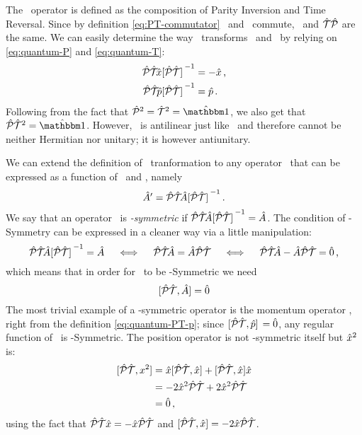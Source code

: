         The \hPT\ operator is defined as the composition of Parity Inversion and Time Reversal. Since by definition \eqref{eq:PT-commutator} \hP\ and \hT\ commute, \hPT\ and $\mathcal{\hat{T}}\mathcal{\hat{P}}$ are the same. We can easily determine the way \hPT\ transforms \hx\ and \hp\ by relying on \eqref{eq:quantum-P} and \eqref{eq:quantum-T}:
        \begin{align}
            \label{eq:quantum-PT-x}
            \PTtransform{\hx}
            &= -\hx
            \mycomma
            \\
            \label{eq:quantum-PT-p}
            \PTtransform{\hp}
            &= \hp
            \myperiod
        \end{align}
        Following from the fact that $\hP^2 = \hT^2 = \togglehat{\idM}$, we also get that $\hPT^2 = \togglehat{\idM}$. However, \hPT\ is antilinear just like \hT\ and therefore cannot be neither Hermitian nor unitary; it is however antiunitary.

        We can extend the definition of \PT\ tranformation to any operator \hA\ that can be expressed as a function of \hx\ and \hp, namely
        \begin{equation}
            \label{eq:pt-transform}
            \hA' = \PTtransform{\hA}
            \myperiod
        \end{equation}
        We say that an operator \hA\ is \emph{\PT-symmetric} if $\PTtransform{\hA} = \hA$. The condition of \PT-Symmetry can be expressed in a cleaner way via a little manipulation:
        \begin{equation*}
            \PTtransform{\hA} = \hA
            \quad\iff\quad
            \hPT\!\hA = \hA\hPT
            \quad\iff\quad
            \hPT\!\hA - \hA\hPT = \hzero
            \mycomma
        \end{equation*}
        which means that in order for \hA\ to be \PT-Symmetric we need
        \begin{equation}
            \label{eq:pt-symmetric-operator}
            \comm*{\hPT}{\hA}\! = \hzero
        \end{equation}
        The most trivial example of a \PT-symmetric operator is the momentum operator \hp, right from the definition \eqref{eq:quantum-PT-p}; since $\comm*{\hPT}{\hp} = \hzero$, any regular function of \hp\ is \PT-Symmetric. The position operator is not \PT-symmetric itself but $\hat{x}^2$ is:
        \begin{align*}
            \comm*{\hPT}{x^2}\!
            &= \hx \comm*{\hPT}{\hx}\! + \comm*{\hPT}{\hx}\! \hx \\
            &= -2\hx^2\hPT + 2\hx^2\hPT \\
            &= \hzero 
            \mycomma
        \end{align*}
        using the fact that $\mathcal{\hat{P}}\mathcal{\hat{T}} \hat{x} = -\hat{x} \mathcal{\hat{P}}\mathcal{\hat{T}}$ and $\comm*{\hPT}{\hx}\! = -2\hx\hPT$.

